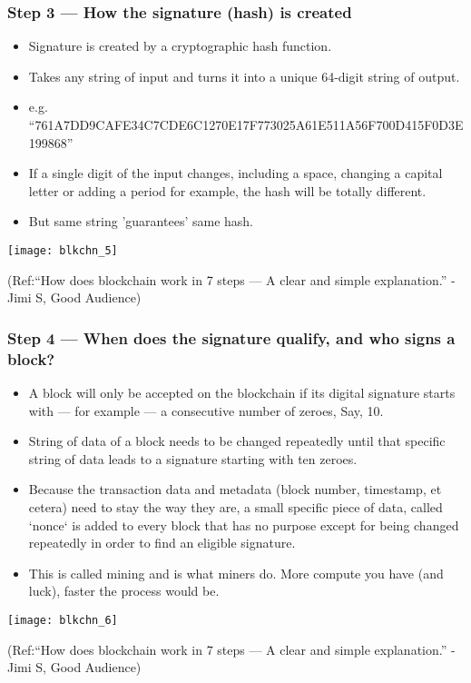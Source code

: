 \begin{frame}[fragile]\frametitle{Step 3 — How the signature (hash) is created}
\begin{itemize}
\item Signature is created by a cryptographic hash function. 
\item Takes any string of input and turns it into a unique 64-digit string of output.
\item e.g. ``761A7DD9CAFE34C7CDE6C1270E17F773025A61E511A56F700D415F0D3E199868''
\item If a single digit of the input changes, including a space, changing a capital letter or adding a period for example, the hash will be totally different.
\item But same string 'guarantees' same hash.
\end{itemize}

\begin{center}
\texttt{[image: blkchn\_5]}

{\tiny (Ref:``How does blockchain work in 7 steps — A clear and simple explanation.'' - Jimi S, Good Audience)}
\end{center}

\end{frame}

\begin{frame}[fragile]\frametitle{Step 4 — When does the signature qualify, and who signs a block?}
\begin{itemize}
\item A block will only be accepted on the blockchain if its digital signature starts with — for example — a consecutive number of zeroes, Say, 10.
\item String of data of a block needs to be changed repeatedly until that specific string of data leads to a signature starting with ten zeroes. 
\item Because the transaction data and metadata (block number, timestamp, et cetera) need to stay the way they are, a small specific piece of data, called `nonce` is added to every block that has no purpose except for being changed repeatedly in order to find an eligible signature.
\item This is called mining and is what miners do. More compute you have (and luck), faster the process would be.
\end{itemize}

\begin{center}
\texttt{[image: blkchn\_6]}

{\tiny (Ref:``How does blockchain work in 7 steps — A clear and simple explanation.'' - Jimi S, Good Audience)}
\end{center}

\end{frame}

